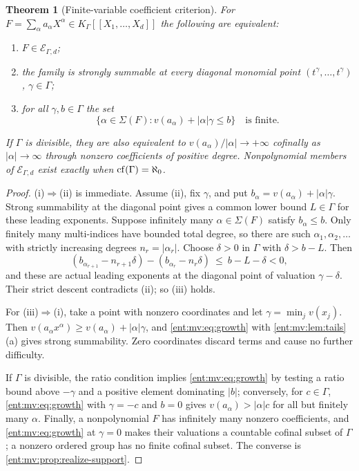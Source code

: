 \documentclass[11pt]{article}
\newtheorem{theorem}{Theorem}[section]
\theoremstyle{plain}
\theoremstyle{plain}
\theoremstyle{plain}
\theoremstyle{definition}
\theoremstyle{definition}
\theoremstyle{definition}
\theoremstyle{definition}
\theoremstyle{remark}
\newcommand{\K}{K_\Gamma}\newcommand{\KD}{K_\Delta}
\begin{document}
\begin{theorem}[Finite-variable coefficient criterion]
\label{ent:thm:multi-criterion}
For $F=\sum_\alpha a_\alpha X^\alpha\in\K[[X_1,\ldots,X_d]]$ the following are
equivalent:
\begin{enumerate}[label=\textnormal{(\roman*)},leftmargin=2em]
\item $F\in\mathcal E_{\Gamma,d}$;
\item the family is strongly summable at every diagonal monomial point
$(t^\gamma,\ldots,t^\gamma)$, $\gamma\in\Gamma$;
\item for all $\gamma,b\in\Gamma$ the set
\begin{equation}\label{ent:mv:eq:growth}
 \{\alpha\in\Sigma(F):v(a_\alpha)+|\alpha|\gamma\le b\}
 \quad\text{is finite.}
\end{equation}
\end{enumerate}
If $\Gamma$ is divisible, they are also equivalent to
$v(a_\alpha)/|\alpha|\to+\infty$ cofinally as $|\alpha|\to\infty$ through
nonzero coefficients of positive degree. Nonpolynomial members of
$\mathcal E_{\Gamma,d}$ exist exactly when $\operatorname{cf}(\Gamma)=\aleph_0$.
\end{theorem}
\begin{proof}
(i)$\Rightarrow$(ii) is immediate. Assume (ii), fix $\gamma$, and put
$b_\alpha=v(a_\alpha)+|\alpha|\gamma$. Strong summability at the diagonal
point gives a common lower bound $L\in\Gamma$ for these leading exponents.
Suppose infinitely many $\alpha\in\Sigma(F)$ satisfy $b_\alpha\le b$. Only
finitely many multi-indices have bounded total degree, so there are such
$\alpha_1,\alpha_2,\ldots$ with strictly increasing degrees $n_r=|\alpha_r|$.
Choose $\delta>0$ in $\Gamma$ with $\delta>b-L$. Then
\[
 (b_{\alpha_{r+1}}-n_{r+1}\delta)-(b_{\alpha_r}-n_r\delta)\ \le\ b-L-\delta<0,
\]
and these are actual leading exponents at the diagonal point of valuation
$\gamma-\delta$. Their strict descent contradicts (ii); so (iii) holds.

For (iii)$\Rightarrow$(i), take a point with nonzero coordinates and let
$\gamma=\min_jv(x_j)$. Then $v(a_\alpha x^\alpha)\ge v(a_\alpha)+|\alpha|\gamma$,
and \eqref{ent:mv:eq:growth} with \cref{ent:mv:lem:tails}(a) gives strong
summability. Zero coordinates discard terms and cause no further difficulty.

If $\Gamma$ is divisible, the ratio condition implies \eqref{ent:mv:eq:growth}
by testing a ratio bound above $-\gamma$ and a positive element dominating
$|b|$; conversely, for $c\in\Gamma$, \eqref{ent:mv:eq:growth} with
$\gamma=-c$ and $b=0$ gives $v(a_\alpha)>|\alpha|c$ for all but finitely many
$\alpha$. Finally, a nonpolynomial $F$ has infinitely many nonzero
coefficients, and \eqref{ent:mv:eq:growth} at $\gamma=0$ makes their
valuations a countable cofinal subset of $\Gamma$; a nonzero ordered group
has no finite cofinal subset. The converse is
\cref{ent:mv:prop:realize-support}.
\end{proof}
\end{document}
